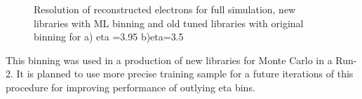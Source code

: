\begin{figure}[h]
\begin{minipage}[h]{0.49\linewidth}
\end{minipage}
\hfill
\begin{minipage}[h]{0.49\linewidth}
\end{minipage}
\caption{Resolution of reconstructed electrons for full simulation, new libraries with ML binning and old tuned libraries with original binning for a) eta =3.95 b)eta=3.5 }
\label{fig:Class}
\end{figure}

This binning was used in a production of new libraries for Monte Carlo in a Run-2. It is planned to use more precise training sample for a future iterations of this procedure for improving performance of outlying eta bins.
